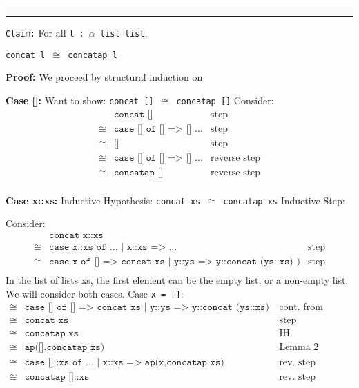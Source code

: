 \documentclass[11pt,letterpaper]{article}
\newcommand{\question}[2] {\vspace{.25in} \hrule\vspace{0.5em}
\noindent{\bf #1: #2} \vspace{0.5em}
\hrule \vspace{.10in}}
\begin{document}
\question{2}{Task 2.3}
\texttt{Claim:} For all \texttt{l : $\alpha$ list list},
\begin{center}
\texttt{concat l $\cong$ concatap l}
\end{center}

\textbf{Proof:} We proceed by structural induction on 

\textbf{Case []:}
Want to show: \texttt{concat [] $\cong$ concatap []}
Consider:
\begin{align*}
        & \texttt{concat []} & \text{step}\\
  \cong & \texttt{case [] of [] => [] ...} & \text{step}\\
  \cong & \texttt{[]} & \text{step}\\
  \cong & \texttt{case [] of [] => [] ...} & \text{reverse step} \\
  \cong & \texttt{concatap []} & \text{reverse step} \\
\end{align*}

\textbf{Case x::xs:}
Inductive Hypothesis: \texttt{concat xs $\cong$ concatap xs}
Inductive Step:


Consider:
\begin{align*}
      & \texttt{concat x::xs} & \\
\cong & \texttt{case x::xs of ... | x::xs => ...} & \text{step}\\
\cong & \texttt{case x of [] => concat xs | y::ys => y::concat (ys::xs) )} & \text{step}\\
\end{align*}
In the list of lists xs, the first element can be the empty list, or a non-empty list.
We will consider both cases.
Case \texttt{x = []}:
\begin{align*}
\cong & \texttt{case [] of [] => concat xs | y::ys => y::concat (ys::xs) )} & \text{cont. from above}\\
\cong & \texttt{concat xs} & \text{step}\\
\cong & \texttt{concatap xs} & \text{IH}\\
\cong & \texttt{ap([],concatap xs)} & \text{Lemma 2}\\
\cong & \texttt{case []::xs of ... | x::xs => ap(x,concatap xs)} & \text{rev. step}\\
\cong & \texttt{concatap []::xs} & \text{rev. step}\\
\end{align*}
\end{document}
